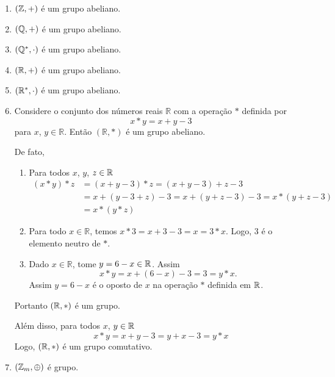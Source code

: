 \begin{exemplos}
    \begin{enumerate}[label={\arabic*})]
        \item $(\mathbb{Z},+)$ {\'e} um grupo abeliano.
        \item $(\mathbb{Q},+)$ {\'e} um grupo abeliano.
        \item $(\mathbb{Q}^*,\cdot)$ {\'e} um grupo abeliano.
        \item $(\mathbb{R},+)$ {\'e} um grupo abeliano.
        \item $(\mathbb{R}^*,\cdot)$ {\'e} um grupo abeliano.
        \item Considere o conjunto dos n{\'u}meros reais $\mathbb{R}$ com a opera{\c c}{\~a}o $*$ definida por
        \[
            x*y = x + y - 3
        \]
        para $x$, $y \in \mathbb{R}$. Ent{\~a}o $(\mathbb{R}, *)$ {\'e} um grupo abeliano.
        \begin{solucao}
            De fato,
            \begin{enumerate}[label={\roman*})]
                \item Para todos $x$, $y$, $z \in \mathbb{R}$
                \begin{align*}
                    (x*y)*z &= (x+y-3)*z = (x+y-3)+z-3\\
                    &= x+(y-3+z)-3 = x+(y+z-3)-3 = x*(y+z-3)\\
                    &= x*(y*z)
                \end{align*}

                \item Para todo $x \in \mathbb{R}$, temos $x*3 = x + 3 - 3 = x = 3 * x$. Logo, 3 {\'e} o elemento neutro de $*$.

                \item Dado $x \in \mathbb{R}$, tome $y = 6 - x \in \mathbb{R}$. Assim
                \[
                    x*y = x + (6-x)-3 = 3 = y*x.
                \]
                Assim $y = 6 - x$ \'e o oposto de $x$ na opera\c{c}\~ao $*$ definida em $\mathbb{R}$.
            \end{enumerate}

            Portanto $(\mathbb{R}, *)$ \'e um grupo.

            Al\'em disso, para todos $x$, $y \in \mathbb{R}$
            \[
                x*y = x + y - 3 = y + x - 3 = y*x
            \]
            Logo, $(\mathbb{R}, *)$ {\'e} um grupo comutativo.
        \end{solucao}

        \item $(\mathbb{Z}_m,\oplus)$ {\'e} grupo.


\end{enumerate}
\end{exemplos}
